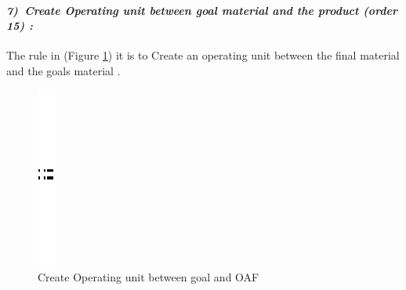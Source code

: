 \paragraph{\emph{7)~Create Operating unit between  goal material  and the product (order 15) :} }
 
 
The rule in (Figure \ref{fig:Create Operating unit between  goal and OAF}) 
it is to Create an operating unit  between the final material and the goals material .
  
\vspace{1cm}
\begin{figure}[th]
\centering 
{}
\quad{}
\includegraphics{Chapiter3/img/sep}
\quad{}

\caption{\label{fig:Create Operating unit between  goal and OAF}Create Operating unit between  goal and OAF}
 
\end{figure}
\vspace{1cm}




